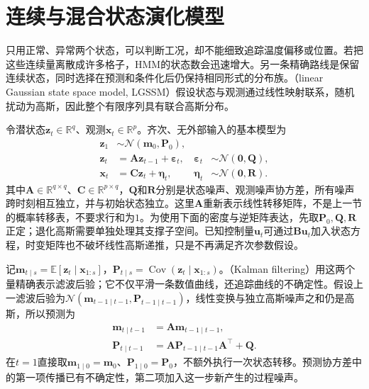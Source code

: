 \section{连续与混合状态演化模型}
\label{sec:pgm-dynamic-continuous}

只用正常、异常两个状态，可以判断工况，却不能细致追踪温度偏移或位置。若把这些连续量离散成许多格子，HMM的状态数会迅速增大。另一条精确路线是保留连续状态，同时选择在预测和条件化后仍保持相同形式的分布族。（linear Gaussian state space model, LGSSM）假设状态与观测通过线性映射联系，随机扰动为高斯，因此整个有限序列具有联合高斯分布。

令潜状态$\bm{z}_t\in\mathbb{R}^{q}$、观测$\bm{x}_t\in\mathbb{R}^{p}$。齐次、无外部输入的基本模型为
\begin{equation}
  \begin{aligned}
    \bm{z}_1&\sim\mathcal{N}(\bm{m}_0,\bm{P}_0),\\
    \bm{z}_t&=\bm{A}\bm{z}_{t-1}+\bm{\varepsilon}_t,
      &\bm{\varepsilon}_t&\sim\mathcal{N}(\bm{0},\bm{Q}),\\
    \bm{x}_t&=\bm{C}\bm{z}_t+\bm{\eta}_t,
      &\bm{\eta}_t&\sim\mathcal{N}(\bm{0},\bm{R}).
  \end{aligned}
  \label{eq:pgm-dynamic-lgssm}
\end{equation}
其中$\bm{A}\in\mathbb{R}^{q\times q}$、$\bm{C}\in\mathbb{R}^{p\times q}$，$\bm{Q}$和$\bm{R}$分别是状态噪声、观测噪声协方差，所有噪声跨时刻相互独立，并与初始状态独立。这里$\bm{A}$重新表示线性转移矩阵，不是上一节的概率转移表，不要求行和为$1$。为使用下面的密度与逆矩阵表达，先取$\bm{P}_0,\bm{Q},\bm{R}$正定；退化高斯需要单独处理其支撑子空间。已知控制量$\bm{u}_t$可通过$\bm{B}\bm{u}_t$加入状态方程，时变矩阵也不破坏线性高斯递推，只是不再满足齐次参数假设。

记$\bm{m}_{t\mid s}=\mathbb{E}[\bm{z}_t\mid\bm{x}_{1:s}]$，$\bm{P}_{t\mid s}=\operatorname{Cov}(\bm{z}_t\mid\bm{x}_{1:s})$。（Kalman filtering）用这两个量精确表示滤波后验；它不仅平滑一条数值曲线，还追踪曲线的不确定性。假设上一滤波后验为$\mathcal{N}(\bm{m}_{t-1\mid t-1},\bm{P}_{t-1\mid t-1})$，线性变换与独立高斯噪声之和仍是高斯，所以预测为
\begin{equation}
  \begin{aligned}
    \bm{m}_{t\mid t-1}&=\bm{A}\bm{m}_{t-1\mid t-1},\\
    \bm{P}_{t\mid t-1}
      &=\bm{A}\bm{P}_{t-1\mid t-1}\bm{A}^{\top}
        +\bm{Q}.
  \end{aligned}
  \label{eq:pgm-dynamic-kalman-predict}
\end{equation}
在$t=1$直接取$\bm{m}_{1\mid0}=\bm{m}_0$、$\bm{P}_{1\mid0}=\bm{P}_0$，不额外执行一次状态转移。预测协方差中的第一项传播已有不确定性，第二项加入这一步新产生的过程噪声。

